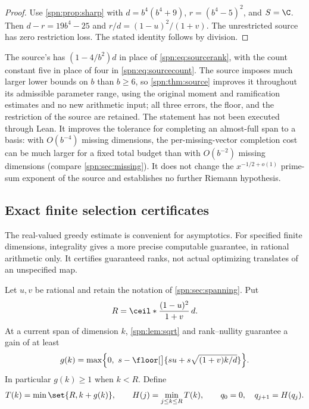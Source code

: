 \begin{proof}
Use \cref{spn:prop:sharp} with $d=b^4(b^4+9)$, $r=(b^4-5)^2$, and $S=\C$. Then
$d-r=19b^4-25$ and $r/d=(1-u)^2/(1+v)$. The unrestricted source has zero
restriction loss. The stated identity follows by division.
\end{proof}

\begin{remark}\label{spn:rem:source-status}
The source's  has $(1-4/b^2)d$ in place of
\eqref{spn:eq:sourcerank}, with the count constant five in place of four in
\eqref{spn:eq:sourcecount}. The source imposes much larger lower bounds on $b$
than $b\ge6$, so \cref{spn:thm:source} improves it throughout its admissible
parameter range, using the original moment and ramification estimates and no
new arithmetic input; all three errors, the floor, and the restriction of the
source are retained. The statement has not been executed through Lean. It
improves the tolerance for completing an almost-full span to a basis: with
$O(b^{-4})$ missing dimensions, the per-missing-vector completion cost can be
much larger for a fixed total budget than with $O(b^{-2})$ missing dimensions
(compare \cref{spn:sec:missing}). It does not change the $x^{-1/2+o(1)}$
prime-sum exponent of the source and establishes no further Riemann
hypothesis.
\end{remark}

\subsection{Exact finite selection certificates}\label{spn:sec:certificates}

The real-valued greedy estimate is convenient for asymptotics. For specified
finite dimensions, integrality gives a more precise computable guarantee, in
rational arithmetic only. It certifies guaranteed ranks, not actual optimizing
translates of an unspecified map.

Let $u,v$ be rational and retain the notation of \cref{spn:sec:spanning}. Put
\[
 R=\ceil*{\frac{(1-u)^2}{1+v}\,d}.
\]
At a current span of dimension $k$, \cref{spn:lem:sqrt} and rank--nullity
guarantee a gain of at least
\[
 g(k)=\max\Bigl\{0,\ s-\floor[\big]{su+s\sqrt{(1+v)k/d}}\Bigr\}.
\]
In particular $g(k)\ge1$ when $k<R$. Define
\[
 T(k)=\min\set{R,k+g(k)},\qquad H(j)=\min_{j\le k\le R}T(k),\qquad
 q_0=0,\quad q_{j+1}=H(q_j).
\]

